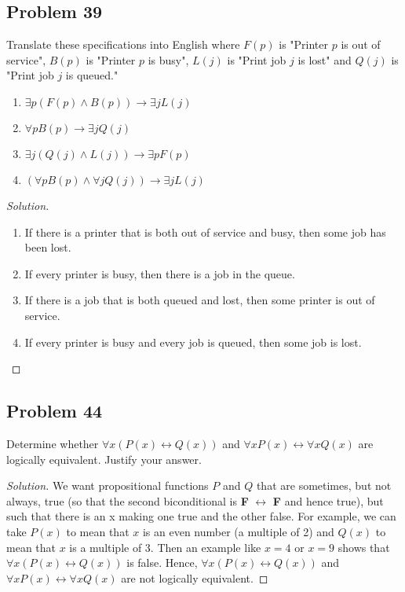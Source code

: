 \documentclass{article}
\newenvironment{solution}{\renewcommand\qedsymbol{}\begin{proof}[Solution]}{\end{proof}}
\begin{document}
\clearpage
\subsection*{Problem 39}
Translate these specifications into English where $F(p)$ is "Printer $p$ is out of service", $B(p)$ is "Printer $p$ is busy", $L(j)$ is "Print job $j$ is lost" and $Q(j)$ is "Print job $j$ is queued."

\begin{enumerate}[leftmargin=16pt, topsep = 8pt]
\item $\exists p(F(p) \land B(p)) \rightarrow \exists jL(j)$
\item $\forall pB(p) \rightarrow \exists jQ(j)$
\item $\exists j(Q(j) \land L(j)) \rightarrow \exists pF(p)$
\item $(\forall pB(p) \land \forall jQ(j)) \rightarrow \exists jL(j)$
\end{enumerate}

\begin{solution}
\hspace{1pt}

\begin{enumerate}[leftmargin=16pt, topsep = 8pt]
\item If there is a printer that is both out of service and busy, then some job has been lost.
\item If every printer is busy, then there is a job in the queue.
\item If there is a job that is both queued and lost, then some printer is out of service.
\item If every printer is busy and every job is queued, then some job is lost.
\end{enumerate}
\end{solution}

\subsection*{Problem 44}
Determine whether $\forall x(P(x) \leftrightarrow Q(x))$ and $\forall xP(x) \leftrightarrow \forall xQ(x)$ are logically equivalent. Justify your answer.

\begin{solution}
We want propositional functions $P$ and $Q$ that are sometimes, but not always, true (so that the second biconditional is \textbf{F} $\leftrightarrow$ \textbf{F} and hence true), but such that there is an x making one true and the other false. For example, we can take $P(x)$ to mean that $x$ is an even number (a multiple of 2) and $Q(x)$ to mean that $x$ is a multiple of 3. Then an example like $x = 4$ or $x = 9$ shows that $\forall x(P(x) \leftrightarrow Q(x))$ is false. Hence, $\forall x(P(x) \leftrightarrow Q(x))$ and $\forall xP(x) \leftrightarrow \forall xQ(x)$ are not logically equivalent.
\end{solution}
\end{document}
